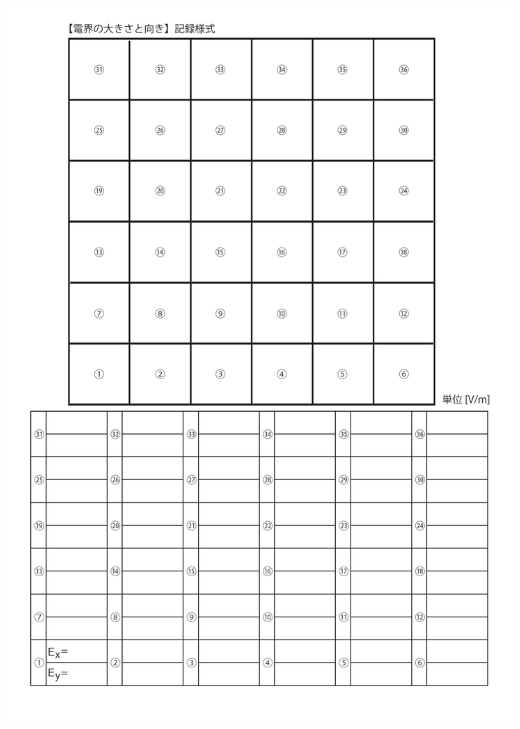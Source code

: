 \documentclass[uplatex,a4paper,11pt,oneside,openany]{jsbook}
\begin{document}
\includegraphics[scale=0.8]{./figure/E1.pdf}

\newpage
\end{document}
